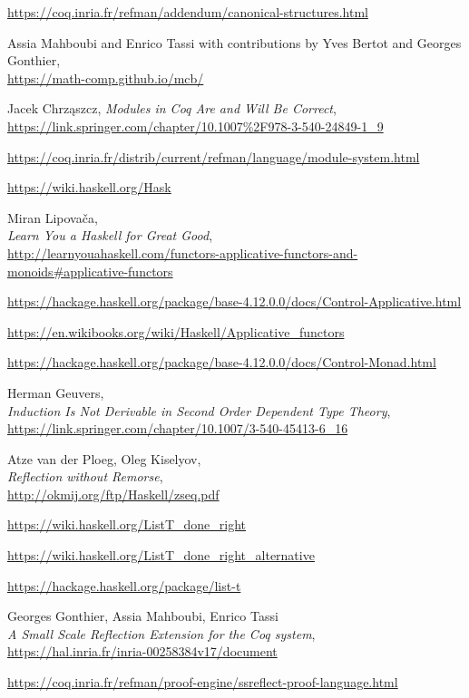 \documentclass[declaration,inz,english,shortabstract]{iithesis}
\begin{document}
\begin{thebibliography}{1}
        \url{https://coq.inria.fr/refman/addendum/canonical-structures.html}

        Assia Mahboubi and Enrico Tassi with contributions by Yves Bertot and Georges Gonthier, \\
        \url{https://math-comp.github.io/mcb/}

        Jacek Chrząszcz,
        \textit{Modules in Coq Are and Will Be Correct}, \\
        \url{https://link.springer.com/chapter/10.1007%2F978-3-540-24849-1_9}

        \url{https://coq.inria.fr/distrib/current/refman/language/module-system.html}

        \url{https://wiki.haskell.org/Hask}

        Miran Lipovača, \\
        \textit{Learn You a Haskell for Great Good}, \\
        \url{http://learnyouahaskell.com/functors-applicative-functors-and-monoids#applicative-functors}

        \url{https://hackage.haskell.org/package/base-4.12.0.0/docs/Control-Applicative.html}

        \url{https://en.wikibooks.org/wiki/Haskell/Applicative_functors}

        \url{https://hackage.haskell.org/package/base-4.12.0.0/docs/Control-Monad.html}

        Herman Geuvers, \\
        \textit{Induction Is Not Derivable in Second Order Dependent Type Theory}, \\
        \url{https://link.springer.com/chapter/10.1007/3-540-45413-6_16}

        Atze van der Ploeg, Oleg Kiselyov, \\
        \textit{Reflection without Remorse}, \\
        \url{http://okmij.org/ftp/Haskell/zseq.pdf}

        \url{https://wiki.haskell.org/ListT_done_right}

        \url{https://wiki.haskell.org/ListT_done_right_alternative}

        \url{https://hackage.haskell.org/package/list-t}

        Georges Gonthier, Assia Mahboubi, Enrico Tassi \\
        \textit{A Small Scale Reflection Extension for the Coq system}, \\
        \url{https://hal.inria.fr/inria-00258384v17/document}

        \url{https://coq.inria.fr/refman/proof-engine/ssreflect-proof-language.html}
\end{thebibliography}

\end{document}
